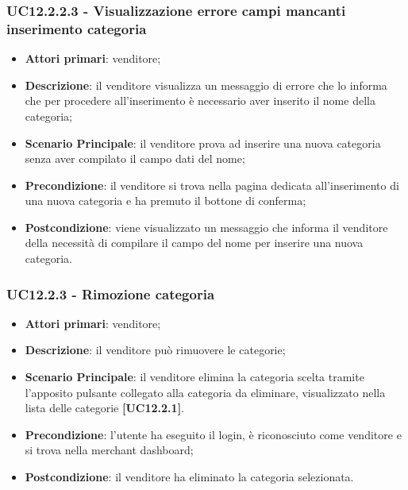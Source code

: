 \subsubsection{UC12.2.2.3 - Visualizzazione errore campi mancanti inserimento categoria}
\begin{itemize}
\item \textbf{Attori primari}: venditore;
\item \textbf{Descrizione}: il venditore visualizza un messaggio di errore che lo informa che per procedere all'inserimento è necessario aver inserito il nome della categoria;
\item \textbf{Scenario Principale}: il venditore prova ad inserire una nuova categoria senza aver compilato il campo dati del nome;
\item \textbf{Precondizione}: il venditore si trova nella pagina dedicata all'inserimento di una nuova categoria e ha premuto il bottone di conferma;
\item \textbf{Postcondizione}: viene visualizzato un messaggio che informa il venditore della necessità di compilare il campo del nome per inserire una nuova categoria.
\end{itemize}

\subsubsection{UC12.2.3 - Rimozione categoria}
\begin{itemize}
\item \textbf{Attori primari}: venditore;
\item \textbf{Descrizione}: il venditore può rimuovere le categorie;
\item \textbf{Scenario Principale}: il venditore elimina la categoria scelta tramite l'apposito pulsante collegato alla categoria da eliminare, visualizzato nella lista delle categorie \textbf{[UC12.2.1]}.
\item \textbf{Precondizione}: l'utente ha eseguito il login, è riconosciuto come venditore e si trova nella merchant dashboard;
\item \textbf{Postcondizione}: il venditore ha eliminato la categoria selezionata.
\end{itemize}


